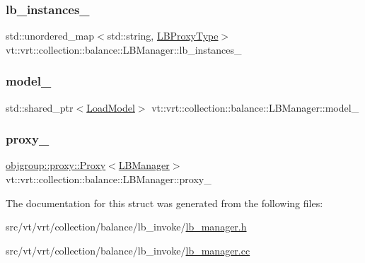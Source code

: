 \subsubsection{\texorpdfstring{lb\+\_\+instances\+\_\+}{lb\_instances\_}}
{\footnotesize\ttfamily std\+::unordered\+\_\+map$<$std\+::string, \hyperlink{structvt_1_1vrt_1_1collection_1_1balance_1_1_l_b_manager_a8b1a7735366beb85c2c2ccc3912cdd80}{L\+B\+Proxy\+Type}$>$ vt\+::vrt\+::collection\+::balance\+::\+L\+B\+Manager\+::lb\+\_\+instances\+\_\+\hspace{0.3cm}{\ttfamily [private]}}

\mbox{\label{structvt_1_1vrt_1_1collection_1_1balance_1_1_l_b_manager_a4298255e00b2012d3417a63130dc91c3}} 
\subsubsection{\texorpdfstring{model\+\_\+}{model\_}}
{\footnotesize\ttfamily std\+::shared\+\_\+ptr$<$\hyperlink{classvt_1_1vrt_1_1collection_1_1balance_1_1_load_model}{Load\+Model}$>$ vt\+::vrt\+::collection\+::balance\+::\+L\+B\+Manager\+::model\+\_\+\hspace{0.3cm}{\ttfamily [private]}}

\mbox{\label{structvt_1_1vrt_1_1collection_1_1balance_1_1_l_b_manager_a4fef6bf68a7aee9980270ceeb5df0c2b}} 
\subsubsection{\texorpdfstring{proxy\+\_\+}{proxy\_}}
{\footnotesize\ttfamily \hyperlink{structvt_1_1objgroup_1_1proxy_1_1_proxy}{objgroup\+::proxy\+::\+Proxy}$<$\hyperlink{structvt_1_1vrt_1_1collection_1_1balance_1_1_l_b_manager}{L\+B\+Manager}$>$ vt\+::vrt\+::collection\+::balance\+::\+L\+B\+Manager\+::proxy\+\_\+\hspace{0.3cm}{\ttfamily [private]}}



The documentation for this struct was generated from the following files\+:\begin{DoxyCompactItemize}
\item 
src/vt/vrt/collection/balance/lb\+\_\+invoke/\hyperlink{lb__manager_8h}{lb\+\_\+manager.\+h}\item 
src/vt/vrt/collection/balance/lb\+\_\+invoke/\hyperlink{lb__manager_8cc}{lb\+\_\+manager.\+cc}\end{DoxyCompactItemize}
